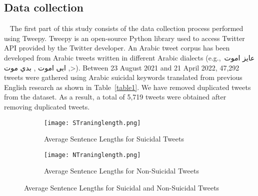 \documentclass[sn-mathphys,Numbered]{sn-jnl}%
\begin{document}
\subsection{Data collection}
~\label{subSec:Datacollection} 
The first part of this study consists of the data collection process performed using Tweepy. Tweepy is an open-source Python library used to access Twitter API provided by the Twitter developer. An Arabic tweet corpus has been developed from Arabic tweets written in different Arabic dialects (e.g.,~\<عايز اموت , ابى اموت , بدي موت>). Between 23 August 2021 and 21 April 2022, 47,292 tweets were gathered using Arabic suicidal keywords translated from previous English research as shown in Table~\ref{table1}. We have removed duplicated tweets from the dataset. As a result, a total of 5,719 tweets were obtained after removing duplicated tweets.

\begin{figure*}[h!]
    \centering
    \begin{subfigure}[t]{0.45\textwidth}
        \centering
        \texttt{[image: STraninglength.png]}
        \caption{\label{WL1} Average Sentence Lengths for Suicidal Tweets}
    \end{subfigure}%
    \hfill
    \begin{subfigure}[t]{0.45\textwidth}
        \centering
        \texttt{[image: NTraninglength.png]}
        \caption{ \label{WL2}Average Sentence Lengths for Non-Suicidal Tweets}
    \end{subfigure}
    \caption{Average Sentence Lengths for  Suicidal and Non-Suicidal Tweets}
\end{figure*}




\end{document}
